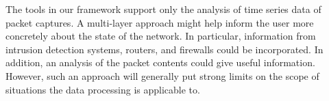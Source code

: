 The tools in our framework support only the analysis of time series data of packet captures. A multi-layer approach might help inform the user more concretely about the state of the network. In particular, information from intrusion detection systems, routers, and firewalls could be incorporated. In addition, an analysis of the packet contents could give useful information. However, such an approach will generally put strong limits on the scope of situations the data processing is applicable to.